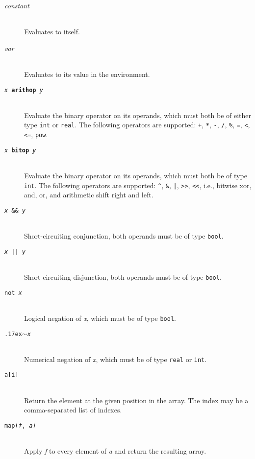 \documentclass[oneside]{memoir}
\newcommand\boolt[0]{\texttt{bool}}
\newcommand\realt[0]{\texttt{real}}
\newcommand\intt[0]{\texttt{int}}
\renewcommand\tilde[0]{{\raise.17ex\hbox{$\scriptstyle\sim$}}}
\begin{document}
\begin{description}
  \item[\textit{constant}]\hfill\\
    Evaluates to itself.

  \item[\textit{var}]\hfill\\
    Evaluates to its value in the environment.

  \item[\texttt{\textit{x} \textbf{arithop} \textit{y}}] \hfill\\
    Evaluate the binary operator on its operands, which must both be
    of either type \intt{} or \realt.  The following operators are
    supported: \texttt{+}, \texttt{*}, \texttt{-}, \texttt{/},
    \texttt{\%}, \texttt{=}, \texttt{<}, \texttt{<=}, \texttt{pow}.

  \item[\texttt{\textit{x} \textbf{bitop} \textit{y}}] \hfill\\
    Evaluate the binary operator on its operands, which must both be
    of type \intt.  The following operators are supported:
    \texttt{\^}, \texttt{\&}, \texttt{|}, \texttt{>>}, \texttt{<<},
    i.e., bitwise xor, and, or, and arithmetic shift right and left.

  \item[\texttt{\textit{x} \&\& \textit{y}}]\hfill\\
    Short-circuiting conjunction, both operands must be of type \boolt.

  \item[\texttt{\textit{x} || \textit{y}}]\hfill\\
    Short-circuiting disjunction, both operands must be of type \boolt.

  \item[\texttt{not \textit{x}}]\hfill\\
    Logical negation of \textit{x}, which must be of type \boolt.

  \item[\texttt{\tilde \textit{x}}]\hfill\\
    Numerical negation of \textit{x}, which must be of type \realt{} or \intt.

  \item[\texttt{a[i]}]\hfill\\
    Return the element at the given position in the array.  The index
    may be a comma-separated list of indexes.

  \item[\texttt{map(\textit{f}, \textit{a})}]\hfill\\
    Apply \textit{f} to every element of \textit{a} and return the resulting array.


\end{description}
\end{document}
